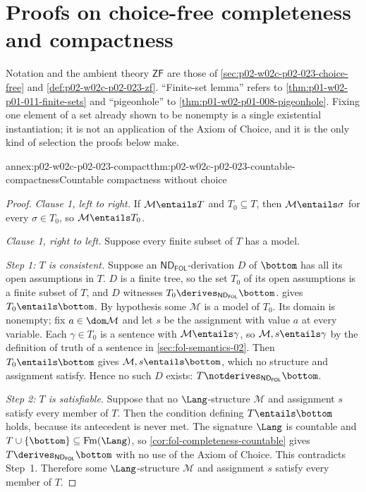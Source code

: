 \section{Proofs on choice-free completeness and compactness}
\label{sec:annex-p02-w02c-p02-023-choice-free}

Notation and the ambient theory \(\mathsf{ZF}\) are those of
\cref{sec:p02-w02c-p02-023-choice-free} and
\cref{def:p02-w02c-p02-023-zf}.  ``Finite-set lemma'' refers to
\cref{thm:p01-w02-p01-011-finite-sets} and ``pigeonhole'' to
\cref{thm:p01-w02-p01-008-pigeonhole}.  Fixing one element of a set already
shown to be nonempty is a single existential instantiation; it is not an
application of the Axiom of Choice, and it is the only kind of selection the
proofs below make.

\begin{annexitem}{annex:p02-w02c-p02-023-compact}{thm:p02-w02c-p02-023-countable-compactness}{Countable compactness without choice}
\begin{proof}
\emph{Clause 1, left to right.}  If \(\mathcal M\entails T\) and
\(T_0\subseteq T\), then \(\mathcal M\entails\sigma\) for every
\(\sigma\in T_0\), so \(\mathcal M\entails T_0\).

\emph{Clause 1, right to left.}  Suppose every finite subset of \(T\) has a
model.

\emph{Step 1: \(T\) is consistent.}  Suppose an \(\mathsf{ND}_{\mathsf{FOL}}\)-derivation
\(D\) of \(\bottom\) has all its open assumptions in \(T\).  \(D\) is a
finite tree, so the set \(T_0\) of its open assumptions is a finite subset
of \(T\), and \(D\) witnesses \(T_0\derives_{\mathsf{ND}_{\mathsf{FOL}}}\bottom\).
 gives \(T_0\entails\bottom\).  By hypothesis some
\(\mathcal M\) is a model of \(T_0\).  Its domain is nonempty; fix
\(a\in\dom\mathcal M\) and let \(s\) be the assignment with value \(a\) at every
variable.  Each \(\gamma\in T_0\) is a sentence with
\(\mathcal M\entails\gamma\), so \(\mathcal M,s\entails\gamma\) by the definition of
truth of a sentence in \cref{sec:fol-semantics-02}.  Then
\(T_0\entails\bottom\) gives \(\mathcal M,s\entails\bottom\), which no structure
and assignment satisfy.  Hence no such \(D\) exists:
\(T\notderives_{\mathsf{ND}_{\mathsf{FOL}}}\bottom\).

\emph{Step 2: \(T\) is satisfiable.}  Suppose that no \(\Lang\)-structure
\(\mathcal M\) and assignment \(s\) satisfy every member of \(T\).  Then the
condition defining \(T\entails\bottom\) holds, because its antecedent is
never met.  The signature \(\Lang\) is countable and
\(T\cup\{\bottom\}\subseteq\operatorname{Fm}(\Lang)\), so
\cref{cor:fol-completeness-countable} gives
\(T\derives_{\mathsf{ND}_{\mathsf{FOL}}}\bottom\) with no use of the Axiom of Choice.  This
contradicts Step~1.  Therefore some \(\Lang\)-structure \(\mathcal M\) and
assignment \(s\) satisfy every member of \(T\).


\end{proof}
\end{annexitem}
